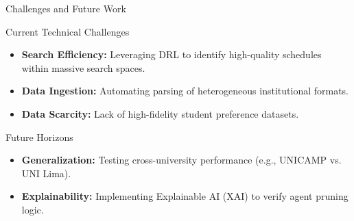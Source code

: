 \begin{frame}{Challenges and Future Work}
    \begin{alertblock}{Current Technical Challenges}
        \begin{itemize}
            \item \textbf{Search Efficiency:} Leveraging DRL to identify high-quality schedules within massive search spaces.
            \item \textbf{Data Ingestion:} Automating parsing of heterogeneous institutional formats.
            \item \textbf{Data Scarcity:} Lack of high-fidelity student preference datasets.
        \end{itemize}
    \end{alertblock}

    \vspace{0.3cm}

    \begin{alertblock}{Future Horizons}
        \begin{itemize}
            \item \textbf{Generalization:} Testing cross-university performance (e.g., UNICAMP vs. UNI Lima).
            \item \textbf{Explainability:} Implementing Explainable AI (XAI) to verify agent pruning logic.
        \end{itemize}
    \end{alertblock}
\end{frame}
